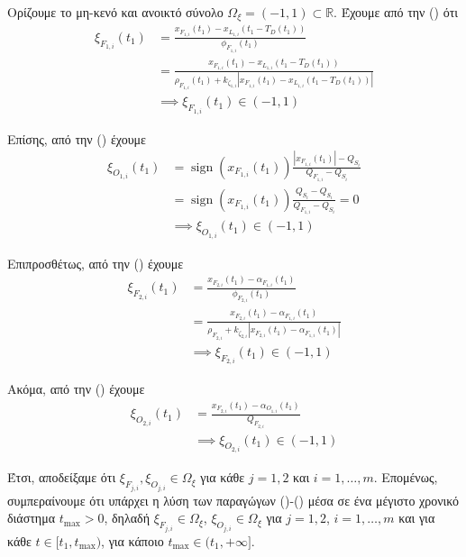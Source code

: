 \begin{proof_of_theorem}
\bigskip
Ορίζουμε το μη-κενό και ανοικτό σύνολο $\Omega_{\xi} = (-1,1) \subset \mathbb{R}$. Έχουμε από την () ότι
\begin{align}
\xi_{F_{1, i}}(t_{1}) &= \frac{x_{F_{1,i}}(t_1) - x_{L_{1,i}}(t_1 - T_D(t_1))}{\phi_{F_{1,i}}(t_1)} \nonumber \\
&= \frac{x_{F_{1,i}}(t_1) - x_{L_{1,i}}(t_1 - T_D(t_1))}{\rho_{F_{1, i}}(t_1) + k_{\zeta_{1, i}}|x_{F_{1,i}}(t_1) - x_{L_{1,i}}(t_1 - T_D(t_1))|} \nonumber \\
&\implies \xi_{F_{1, i}}(t_{1}) \in (-1, 1) \label{xiF1inOxistart}
\end{align}

\bigskip
Επίσης, από την () έχουμε
\begin{align}
\xi_{O_{1,i}}(t_1) &= \operatorname{sign}(x_{F_{1,i}}(t_1))\frac{|x_{F_{1,i}}(t_1)| - Q_{S_{i}}}{Q_{F_{1, i}} - Q_{S_{i}}} \nonumber \\
&= \operatorname{sign}(x_{F_{1,i}}(t_1)) \frac{Q_{S_{i}} - Q_{S_{i}}}{Q_{F_{1, i}} - Q_{S_{i}}} = 0 \nonumber \\
&\implies \xi_{O_{1,i}}(t_1) \in (-1, 1) \label{xiO1inOxistart}
\end{align}

\bigskip
Επιπροσθέτως, από την () έχουμε
\begin{align}
\xi_{F_{2,i}}(t_1) &= \frac{x_{F_{2,i}}(t_1) - \alpha_{F_{1,i}}(t_1)}{\phi_{F_{2,i}}(t_1)} \nonumber \\
&= \frac{x_{F_{2,i}}(t_1) - \alpha_{F_{1,i}}(t_1)}{\rho_{F_{2, i}} + k_{\zeta_{2, i}}|x_{F_{2,i}}(t_1) - \alpha_{F_{1,i}}(t_1)|} \nonumber \\
&\implies \xi_{F_{2,i}}(t_1) \in (-1, 1) \label{xiF2inOxistart}
\end{align}

\bigskip
Ακόμα, από την () έχουμε
\begin{align}
\xi_{O_{2,i}}(t_1) &= \frac{x_{F_{2,i}}(t_1) - \alpha_{O_{1,i}}(t_1)}{Q_{F_{2, i}}} \nonumber \\
&\implies \xi_{O_{2,i}}(t_1) \in (-1, 1) \label{xiO2inOxistart}
\end{align}

\bigskip
Έτσι, αποδείξαμε ότι $\xi_{F_{j,i}}, \xi_{O_{j,i}} \in \Omega_{\xi}$ για κάθε $j = 1, 2$ και $i=1,\ldots,m$. Επομένως, συμπεραίνουμε ότι υπάρχει η λύση των παραγώγων ()-() μέσα σε ένα μέγιστο χρονικό διάστημα $t_{\text{max}}>0$, δηλαδή $\xi_{F_{j,i}} \in \Omega_{\xi}$, $\xi_{O_{j,i}} \in \Omega_{\xi}$ για $j=1,2$, $i=1,\ldots,m$ και για κάθε $t\in[t_1,t_{\text{max}})$, για κάποιο $t_{\text{max}}\in(t_1,+\infty]$.


\end{proof_of_theorem}
